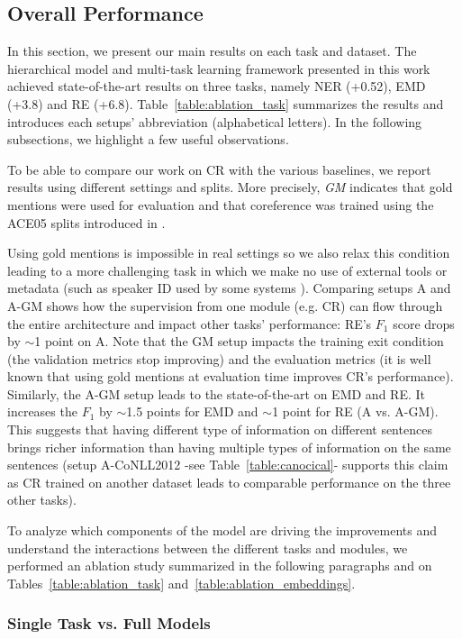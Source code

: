 \documentclass[letterpaper]{article} %
\begin{document}
\subsection{Overall Performance}

In this section, we present our main results on each task and dataset. The hierarchical model and multi-task learning framework presented in this work achieved state-of-the-art results on three tasks, namely NER (+0.52), EMD (+3.8) and RE (+6.8). Table~\ref{table:ablation_task} summarizes the results and introduces each setups' abbreviation (alphabetical letters). In the following subsections, we highlight a few useful observations.

To be able to compare our work on CR with the various baselines, we report results using different settings and splits. More precisely, \textit{GM} indicates that gold mentions were used for evaluation and that coreference was trained using the ACE05 splits introduced in \cite{Rahman2009}.

Using gold mentions is impossible in real settings so we also relax this condition leading to a more challenging task in which we make no use of external tools or metadata (such as speaker ID used by some systems \cite{Clark2015}). Comparing setups A and A-GM shows how the supervision from one module (e.g. CR) can flow through the entire architecture and impact other tasks' performance: RE's $F_{1}$ score drops by $\sim$1 point on A. Note that the GM setup impacts the training exit condition (the validation metrics stop improving) and the evaluation metrics (it is well known that using gold mentions at evaluation time improves CR's performance).
Similarly, the A-GM setup leads to the state-of-the-art on EMD and RE. It increases the $F_{1}$ by $\sim$1.5 points for EMD and $\sim$1 point for RE (A vs. A-GM). This suggests that having different type of information on different sentences brings richer information than having multiple types of information on the same sentences (setup A-CoNLL2012 -see Table~\ref{table:canocical}- supports this claim as CR trained on another dataset leads to comparable performance on the three other tasks).

To analyze which components of the model are driving the improvements and understand the interactions between the different tasks and modules, we performed an ablation study summarized in the following paragraphs and on Tables~\ref{table:ablation_task} and~\ref{table:ablation_embeddings}.

\subsubsection*{Single Task vs. Full Models}
\end{document}
